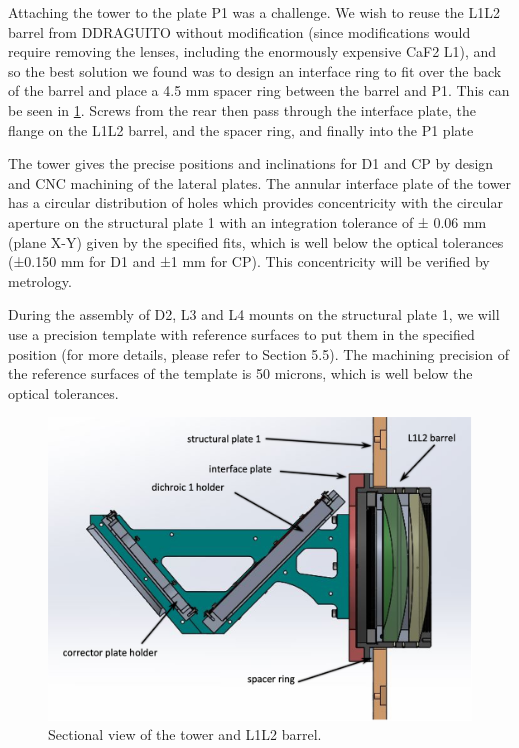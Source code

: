 \documentclass{report}
\begin{document}
Attaching the tower to the plate P1 was a challenge. We wish to reuse the L1L2 barrel from DDRAGUITO without modification (since modifications would require removing the lenses, including the enormously expensive CaF2 L1), and so the best solution we found was to design an interface ring to fit over the back of the barrel and place a 4.5 mm spacer ring between the barrel and P1. This can be seen in \ref{figure:tower-section}. Screws from the rear then pass through the interface plate, the flange on the L1L2 barrel, and the spacer ring, and finally into the P1 plate

The tower gives the precise positions and inclinations for D1 and CP by design and CNC machining of the lateral plates. The annular interface plate of the tower has a circular distribution of holes which provides concentricity with the circular aperture on the structural plate 1 with an integration tolerance of ± 0.06 mm (plane X-Y) given by the specified fits, which is well below the optical tolerances (±0.150 mm for D1 and ±1 mm for CP). This concentricity will be verified by metrology.

During the assembly of D2, L3 and L4 mounts on the structural plate 1, we will use a precision template with reference surfaces to put them in the specified position (for more details, please refer to Section 5.5). The machining precision of the reference surfaces of the template is 50 microns, which is well below the optical tolerances.

\begin{figure}
\begin{center}
\includegraphics[width=0.7\linewidth]{figures/tower-section.png}
\end{center}
\caption{Sectional view of the tower and L1L2 barrel.}
\label{figure:tower-section}
\end{figure}
 
\end{document}
